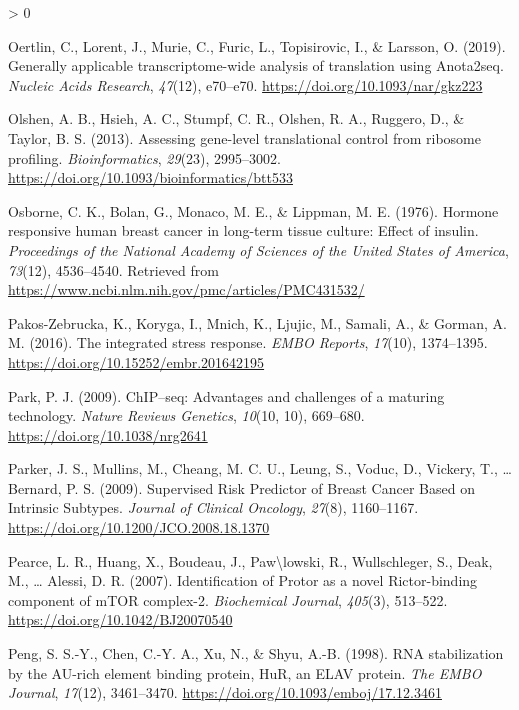 \documentclass[
  12pt,
  openany]{book}
\newlength{\cslhangindent}
\newenvironment{CSLReferences}[2] %
 {%
  \setlength{\parindent}{0pt}
  \ifodd #1 \everypar{\setlength{\hangindent}{\cslhangindent}}\ignorespaces\fi
  \ifnum #2 > 0
  \setlength{\parskip}{#2\baselineskip}
  \fi
 }%
 {}
\begin{document}
\begin{CSLReferences}{1}{0}
\leavevmode\hypertarget{ref-Oertlin2019}{}%
Oertlin, C., Lorent, J., Murie, C., Furic, L., Topisirovic, I., \& Larsson, O. (2019). Generally applicable transcriptome-wide analysis of translation using Anota2seq. \emph{Nucleic Acids Research}, \emph{47}(12), e70--e70. \url{https://doi.org/10.1093/nar/gkz223}

\leavevmode\hypertarget{ref-Olshen2013}{}%
Olshen, A. B., Hsieh, A. C., Stumpf, C. R., Olshen, R. A., Ruggero, D., \& Taylor, B. S. (2013). Assessing gene-level translational control from ribosome profiling. \emph{Bioinformatics}, \emph{29}(23), 2995--3002. \url{https://doi.org/10.1093/bioinformatics/btt533}

\leavevmode\hypertarget{ref-Osborne1976}{}%
Osborne, C. K., Bolan, G., Monaco, M. E., \& Lippman, M. E. (1976). Hormone responsive human breast cancer in long-term tissue culture: Effect of insulin. \emph{Proceedings of the National Academy of Sciences of the United States of America}, \emph{73}(12), 4536--4540. Retrieved from \url{https://www.ncbi.nlm.nih.gov/pmc/articles/PMC431532/}

\leavevmode\hypertarget{ref-Pakos-Zebrucka2016}{}%
Pakos-Zebrucka, K., Koryga, I., Mnich, K., Ljujic, M., Samali, A., \& Gorman, A. M. (2016). The integrated stress response. \emph{EMBO Reports}, \emph{17}(10), 1374--1395. \url{https://doi.org/10.15252/embr.201642195}

\leavevmode\hypertarget{ref-Park2009}{}%
Park, P. J. (2009). {ChIP}--seq: Advantages and challenges of a maturing technology. \emph{Nature Reviews Genetics}, \emph{10}(10, 10), 669--680. \url{https://doi.org/10.1038/nrg2641}

\leavevmode\hypertarget{ref-Parker2009}{}%
Parker, J. S., Mullins, M., Cheang, M. C. U., Leung, S., Voduc, D., Vickery, T., \ldots{} Bernard, P. S. (2009). Supervised {Risk Predictor} of {Breast Cancer Based} on {Intrinsic Subtypes}. \emph{Journal of Clinical Oncology}, \emph{27}(8), 1160--1167. \url{https://doi.org/10.1200/JCO.2008.18.1370}

\leavevmode\hypertarget{ref-Pearce2007}{}%
Pearce, L. R., Huang, X., Boudeau, J., Paw\textbackslash lowski, R., Wullschleger, S., Deak, M., \ldots{} Alessi, D. R. (2007). Identification of {Protor} as a novel {Rictor}-binding component of {mTOR} complex-2. \emph{Biochemical Journal}, \emph{405}(3), 513--522. \url{https://doi.org/10.1042/BJ20070540}

\leavevmode\hypertarget{ref-Peng1998}{}%
Peng, S. S.-Y., Chen, C.-Y. A., Xu, N., \& Shyu, A.-B. (1998). {RNA} stabilization by the {AU}-rich element binding protein, {HuR}, an {ELAV} protein. \emph{The EMBO Journal}, \emph{17}(12), 3461--3470. \url{https://doi.org/10.1093/emboj/17.12.3461}


\end{CSLReferences}
\end{document}
